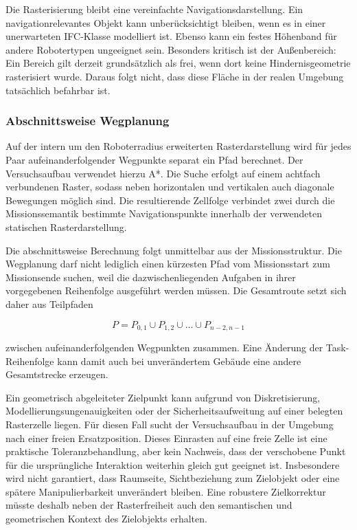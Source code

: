 Die Rasterisierung bleibt eine vereinfachte Navigationsdarstellung. Ein navigationrelevantes Objekt
kann unberücksichtigt bleiben, wenn es in einer unerwarteten IFC-Klasse modelliert ist. Ebenso kann
ein festes Höhenband für andere Robotertypen ungeeignet sein. Besonders kritisch ist der
Außenbereich: Ein Bereich gilt derzeit grundsätzlich als frei, wenn dort keine Hindernisgeometrie
rasterisiert wurde. Daraus folgt nicht, dass diese Fläche in der realen Umgebung tatsächlich
befahrbar ist.

\subsubsection{Abschnittsweise Wegplanung}
Auf der intern um den Roboterradius erweiterten Rasterdarstellung wird für jedes Paar
aufeinanderfolgender Wegpunkte separat ein Pfad berechnet. Der Versuchsaufbau verwendet hierzu A*.
Die Suche erfolgt auf einem achtfach verbundenen Raster, sodass neben horizontalen und vertikalen
auch diagonale Bewegungen möglich sind. Die resultierende Zellfolge verbindet zwei durch die
Missionssemantik bestimmte Navigationspunkte innerhalb der verwendeten statischen Rasterdarstellung.

Die abschnittsweise Berechnung folgt unmittelbar aus der Missionsstruktur. Die Wegplanung darf nicht
lediglich einen kürzesten Pfad vom Missionsstart zum Missionsende suchen, weil die
dazwischenliegenden Aufgaben in ihrer vorgegebenen Reihenfolge ausgeführt werden müssen. Die
Gesamtroute setzt sich daher aus Teilpfaden

\[
P = P_{0,1} \cup P_{1,2} \cup \ldots \cup P_{n-2,n-1}
\]

zwischen aufeinanderfolgenden Wegpunkten zusammen. Eine Änderung der Task-Reihenfolge kann damit auch bei unverändertem Gebäude eine andere Gesamtstrecke erzeugen.

Ein geometrisch abgeleiteter Zielpunkt kann aufgrund von Diskretisierung,
Modellierungsungenauigkeiten oder der Sicherheitsaufweitung auf einer belegten Rasterzelle liegen.
Für diesen Fall sucht der Versuchsaufbau in der Umgebung nach einer freien Ersatzposition. Dieses
Einrasten auf eine freie Zelle ist eine praktische Toleranzbehandlung, aber kein Nachweis, dass der
verschobene Punkt für die ursprüngliche Interaktion weiterhin gleich gut geeignet ist. Insbesondere
wird nicht garantiert, dass Raumseite, Sichtbeziehung zum Zielobjekt oder eine spätere
Manipulierbarkeit unverändert bleiben. Eine robustere Zielkorrektur müsste deshalb neben der
Rasterfreiheit auch den semantischen und geometrischen Kontext des Zielobjekts erhalten.


